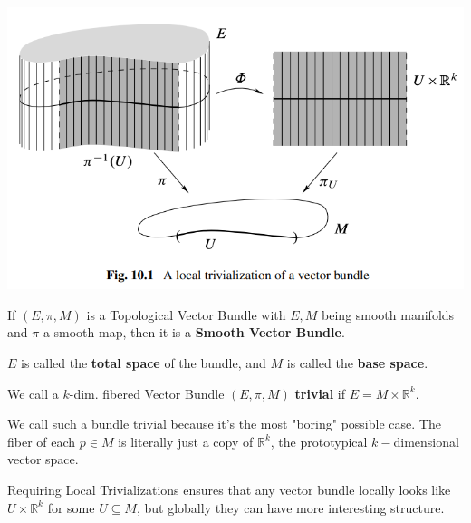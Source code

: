 \documentclass[11pt]{article}
\begin{document}
\begin{center}
    \includegraphics*[scale=0.60]{pictures/LeeSM_fig10.1.png}\\
    \cite[Figure 10.1 from LeeSM]{LeeSM}
\end{center}



\begin{definition}
    If $(E, \pi, M)$ is a Topological Vector Bundle with $E, M$ being smooth manifolds and $\pi$ a smooth map, then it is a \textbf{Smooth Vector Bundle}.
\end{definition} $E$ is called the \textbf{total space} of the bundle, and $M$ is called the \textbf{base space}.

\begin{definition}
    We call a $k$-dim. fibered Vector Bundle $(E, \pi, M)$ \textbf{trivial} if $E = M \times \mathbb{R}^k$.
\end{definition}

We call such a bundle trivial because it's the most "boring" possible case. The fiber of each $p \in M$ is literally just a copy of $\mathbb{R}^k$, the prototypical $k-$dimensional vector space.

\begin{redbox}
    Requiring Local Trivializations ensures that any vector bundle locally looks like $U \times \mathbb{R}^{k}$ for some $U \subseteq M$, but globally they can have more interesting structure.
\end{redbox}
\end{document}
